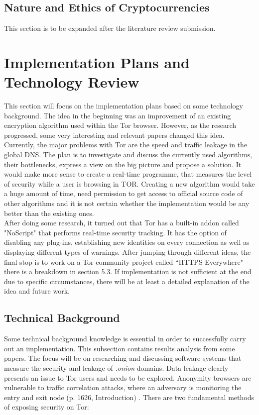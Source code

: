 \documentclass[a4paper, 12pt, titlepage]{article}
\begin{document}
\subsection{Nature and Ethics of Cryptocurrencies}
This section is to be expanded after the literature review submission.

\section{Implementation Plans and Technology Review}
This section will focus on the implementation plans based on some technology background. The idea in the beginning was an improvement of an existing encryption algorithm used within the Tor browser. However, as the research progressed, some very interesting and relevant papers changed this idea. Currently, the major problems with Tor are the speed and traffic leakage in the global DNS. The plan is to investigate and discuss the currently used algorithms, their bottlenecks, express a view on the big picture and propose a solution. It would make more sense to create a real-time programme, that measures the level of security while a user is browsing in TOR. Creating a new algorithm would take a huge amount of time, need permission to get access to official source code of other algorithms and it is not certain whether the implementation would be any better than the existing ones. \\[6pt]
After doing some research, it turned out that Tor has a built-in addon called "NoScript" that performs real-time security tracking. It has the option of disabling any plug-ins, establishing new identities on every connection as well as displaying different types of warnings. After jumping through different ideas, the final stop is to work on a Tor community project called ``HTTPS Everywhere" - there is a breakdown in section 5.3. If implementation is not sufficient at the end due to specific circumstances, there will be at least a detailed explanation of the idea and future work.

\subsection{Technical Background}
Some technical background knowledge is essential in order to successfully carry out an implementation. This subsection contains results analysis from some papers. The focus will be on researching and discussing software systems that measure the security and leakage of \textit{.onion} domains. Data leakage clearly presents an issue to Tor users and needs to be explored. Anonymity browsers are vulnerable to traffic correlation attacks, where an adversary is monitoring the entry and exit node (p. 1626, Introduction) \cite{AnonymityImpactonTor}. There are two fundamental methods of exposing security on Tor:
\end{document}
